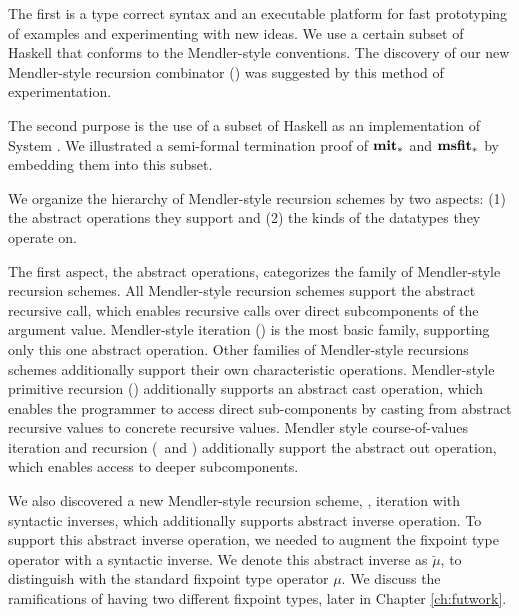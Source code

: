 The first is a type correct syntax and an executable platform for
fast prototyping of examples and experimenting with new ideas. We use
a certain subset of Haskell that conforms to the Mendler-style conventions.
The discovery of our new Mendler-style recursion combinator (\MsfIt)
was suggested by this method of experimentation.

The second purpose is the use of a subset of Haskell as an implementation of
System \Fw. We illustrated a semi-formal termination proof of
$\mathbf{mit}_{*}$ and $\mathbf{msfit}_{*}$ by embedding them into this subset.

We organize the hierarchy of Mendler-style recursion schemes
by two aspects: (1) the abstract operations they support and
(2) the kinds of the datatypes they operate on.

The first aspect, the abstract operations, categorizes the family
of Mendler-style recursion schemes. All Mendler-style recursion schemes
support the abstract recursive call, which enables recursive
calls over direct subcomponents of the argument value.
Mendler-style iteration (\MIt) is the most basic family,
supporting only this one abstract operation. Other
families of Mendler-style recursions schemes additionally support
their own characteristic operations. Mendler-style primitive recursion (\MPr)
additionally supports an abstract cast operation, which enables the programmer
to access direct sub-components by casting from abstract recursive values to
concrete recursive values. Mendler style course-of-values iteration and
recursion (\McvIt\ and \McvPr) additionally support the abstract out
operation, which enables access to deeper subcomponents. 

We also discovered
a new Mendler-style recursion scheme, \MsfIt, iteration with syntactic inverses,
which additionally supports abstract inverse operation. To support
this abstract inverse operation, we needed to augment the fixpoint type operator
with a syntactic inverse. We denote this abstract inverse as $\breve{\mu}$,
to distinguish with the standard fixpoint type operator $\mu$. We discuss
the ramifications of having two different fixpoint types, later in
Chapter \ref{ch:futwork}.

